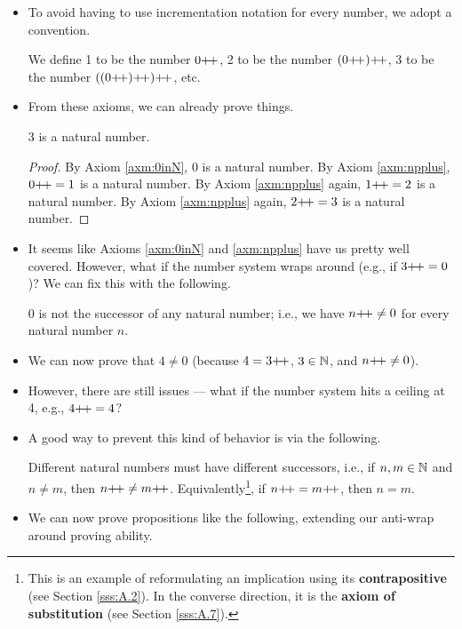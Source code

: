 \documentclass[../main.tex]{subfiles}
\begin{document}
\begin{itemize}
\begin{axm}
    \end{axm}
    \item To avoid having to use incrementation notation for every number, we adopt a convention.
    \begin{dfn}
        We define 1 to be the number $0{+\!+}$, 2 to be the number $(0{+\!+}){+\!+}$, 3 to be the number $((0{+\!+}){+\!+}){+\!+}$, etc.
    \end{dfn}
    \item From these axioms, we can already prove things.
    \begin{prp}
        3 is a natural number.
        \begin{proof}
            By Axiom \ref{axm:0inN}, 0 is a natural number. By Axiom \ref{axm:npplus}, $0{+\!+}=1$ is a natural number. By Axiom \ref{axm:npplus} again, $1{+\!+}=2$ is a natural number. By Axiom \ref{axm:npplus} again, $2{+\!+}=3$ is a natural number.
        \end{proof}
    \end{prp}
    \item It seems like Axioms \ref{axm:0inN} and \ref{axm:npplus} have us pretty well covered. However, what if the number system wraps around (e.g., if $3{+\!+}=0$)? We can fix this with the following.
    \begin{axm}\label{axm:0NotSuccessor}
        0 is not the successor of any natural number; i.e., we have $n{+\!+}\neq 0$ for every natural number $n$.
    \end{axm}
    \item We can now prove that $4\neq 0$ (because $4=3{+\!+}$, $3\in\mathbb{N}$, and $n{+\!+}\neq 0$).
    \item However, there are still issues --- what if the number system hits a ceiling at 4, e.g., $4{+\!+}=4$?
    \item A good way to prevent this kind of behavior is via the following.
    \begin{axm}\label{axm:successorDistinctness}
        Different natural numbers must have different successors, i.e., if $n,m\in\mathbb{N}$ and $n\neq m$, then $n{+\!+}\neq m{+\!+}$. Equivalently\footnote{This is an example of reformulating an implication using its \textbf{contrapositive} (see Section \ref{sss:A.2}). In the converse direction, it is the \textbf{axiom of substitution} (see Section \ref{sss:A.7}).}, if $n{+\!+}=m{+\!+}$, then $n=m$.
    \end{axm}
    \item We can now prove propositions like the following, extending our anti-wrap around proving ability.

\end{itemize}
\end{document}
